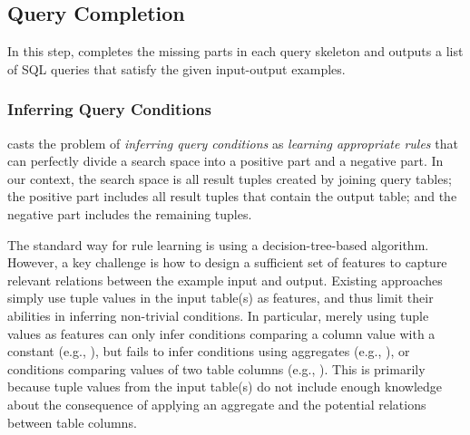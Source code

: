 

\subsection{Query Completion}
\label{sec:completion}

\enlargethispage{5pt}
\vspace{-1mm}

In this step, \ourtool completes the missing parts
in each query skeleton and outputs a list of SQL queries
that satisfy the given input-output examples.




\subsubsection{Inferring Query Conditions}
\label{sec:condition}

\ourtool casts the problem of \textit{inferring query conditions} as
 \textit{learning appropriate rules} that can perfectly divide a search space
into a positive part and a negative part. In our context, the search space
is all result tuples created by joining query tables; the positive part
includes all result tuples that contain the output table; and the negative part includes the remaining tuples.

The standard way for rule learning is using a decision-tree-based
algorithm. However, a key challenge is how
to design a sufficient set of features to capture relevant
relations between the example input and output.
Existing approaches~\cite{Tran:2009} simply use
tuple values in the input table(s) as features, 
and thus limit their abilities in inferring non-trivial
conditions. In particular,
merely using tuple values as features can only infer
conditions comparing a column value with a constant
(e.g., ), but
fails to infer conditions using aggregates (e.g., ),
or conditions comparing values of two table columns
(e.g., ).
This is primarily because tuple values from the input table(s)
do not include enough knowledge about the consequence of
applying an aggregate and the potential relations between
table columns.


